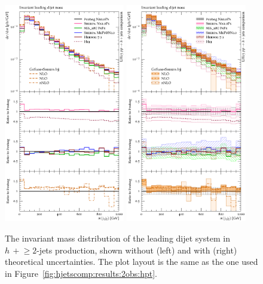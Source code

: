 \begin{figure}[t!]
  \centering
  \includegraphics[width=0.47\textwidth]{figures/hjetscomp_u_dijet_mass.pdf}
  \hfill
  \includegraphics[width=0.47\textwidth]{figures/hjetscomp_dijet_mass.pdf}
  \caption{\label{fig:hjetscomp:results:2obs:mjj}%
    The invariant mass distribution of the leading dijet system in
    $h\,+\!\ge\!\!2$-jets production, shown without (left) and with (right)
    theoretical uncertainties. The plot layout is the same as the one
    used in Figure~\ref{fig:hjetscomp:results:2obs:hpt}.}
\end{figure}

